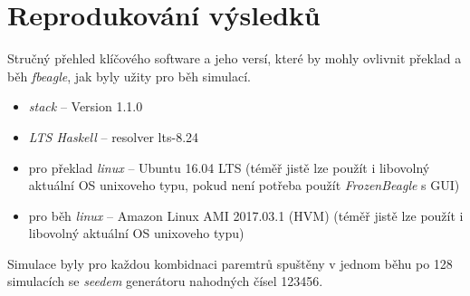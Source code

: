 \section{Reprodukování výsledků}
\label{sec:reproducing}

Stručný přehled klíčového software a jeho versí, které by mohly ovlivnit překlad a běh \textit{fbeagle},
jak byly užity pro běh simulací.

\begin{itemize}
  \item \textit{stack} -- Version 1.1.0
  \item \textit{LTS Haskell} -- resolver lts-8.24
  \item pro překlad \textit{linux} -- Ubuntu 16.04 LTS (téměř jistě lze použít i libovolný aktuální OS unixoveho typu, pokud není potřeba použít \textit{FrozenBeagle} s GUI)
  \item pro běh \textit{linux} -- Amazon Linux AMI 2017.03.1 (HVM) (téměř jistě lze použít i libovolný aktuální OS unixoveho typu)
\end{itemize}

Simulace byly pro každou kombidnaci paremtrů spuštěny v jednom běhu po 128 simulacích se
\textit{seedem} generátoru nahodných čísel 123456.
